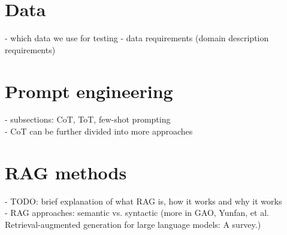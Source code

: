 \section*{Data}

- which data we use for testing
- data requirements (domain description requirements)


\section*{Prompt engineering}
- subsections: CoT, ToT, few-shot prompting \\
- CoT can be further divided into more approaches


\section*{RAG methods}
- TODO: brief explanation of what RAG is, how it works and why it works \\
- RAG approaches: semantic vs. syntactic (more in GAO, Yunfan, et al. Retrieval-augmented generation for large language models: A survey.) \\
